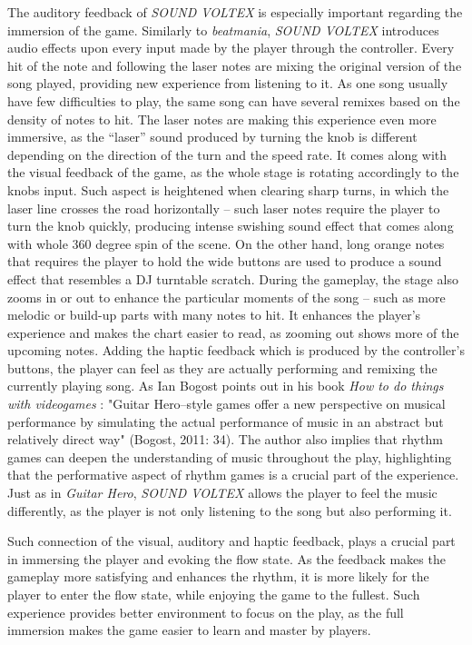The auditory feedback of \textit{SOUND VOLTEX} is especially important regarding the immersion of the game. Similarly to \textit{beatmania}, \textit{SOUND VOLTEX} introduces audio effects upon every input made by the player through the controller. Every hit of the note and following the laser notes are mixing the original version of the song played, providing new experience from listening to it. As one song usually have few difficulties to play, the same song can have several remixes based on the density of notes to hit. The laser notes are making this experience even more immersive, as the ``laser'' sound produced by turning the knob is different depending on the direction of the turn and the speed rate. It comes along with the visual feedback of the game, as the whole stage is rotating accordingly to the knobs input. Such aspect is heightened when clearing sharp turns, in which the laser line crosses the road horizontally -- such laser notes require the player to turn the knob quickly, producing intense swishing sound effect that comes along with whole 360 degree spin of the scene. On the other hand, long orange notes that requires the player to hold the wide buttons are used to produce a sound effect that resembles a DJ turntable scratch. During the gameplay, the stage also zooms in or out to enhance the particular moments of the song -- such as more melodic or build-up parts with many notes to hit. It enhances the player’s experience and makes the chart easier to read, as zooming out shows more of the upcoming notes. Adding the haptic feedback which is produced by the controller’s buttons, the player can feel as they are actually performing and remixing the currently playing song. As Ian Bogost points out in his book \textit{How to do things with videogames} \cite{bogostmusic}: "Guitar Hero–style games offer a new perspective on musical performance by simulating the actual performance of music in an abstract but relatively direct way" (Bogost, 2011: 34). The author also implies that rhythm games can deepen the understanding of music throughout the play, highlighting that the performative aspect of rhythm games is a crucial part of the experience. Just as in \textit{Guitar Hero}, \textit{SOUND VOLTEX} allows the player to feel the music differently, as the player is not only listening to the song but also performing it.

Such connection of the visual, auditory and haptic feedback, plays a crucial part in immersing the player and evoking the flow state. As the feedback makes the gameplay more satisfying and enhances the rhythm, it is more likely for the player to enter the flow state, while enjoying the game to the fullest. Such experience provides better environment to focus on the play, as the full immersion makes the game easier to learn and master by players.

